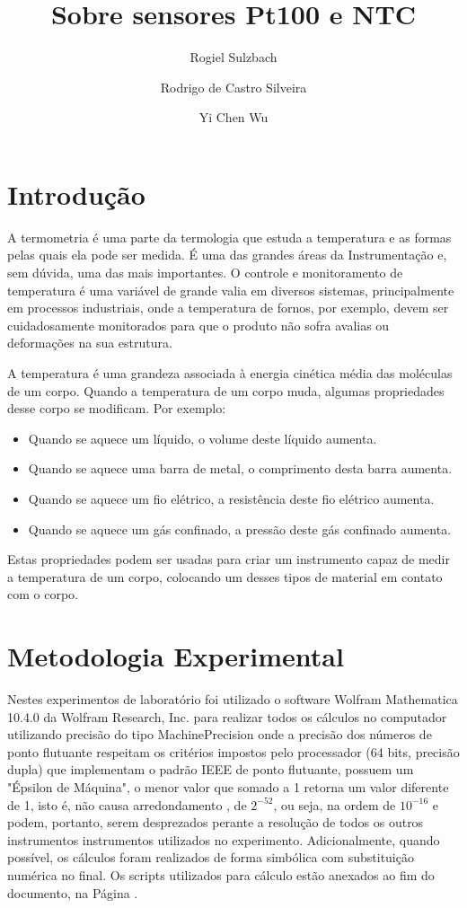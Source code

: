 \documentclass[a4paper]{instrumentacao}
\title{Sobre sensores Pt100 e NTC}
\author{Rogiel Sulzbach \and Rodrigo de Castro Silveira \and Yi Chen Wu}
\institute{Universidade Federal do Rio Grande do Sul, Departamento de Engenharia Elétrica, Curso de Engenharia Elétrica, Instrumentação A, Profs. Dr. Alexandre Balbinot e Dra. Léia Bagesteiro}
\begin{document}
\maketitle


\chapter{Introdução}
A termometria é uma parte da termologia que estuda a temperatura e as formas pelas quais ela pode ser medida.  É uma das grandes áreas da Instrumentação e, sem dúvida, uma das mais importantes. O controle e monitoramento de temperatura é uma variável de grande valia em diversos sistemas, principalmente em processos industriais, onde a temperatura de fornos, por exemplo, devem ser cuidadosamente monitorados para que o produto não sofra avalias ou deformações na sua estrutura.

A temperatura é uma grandeza associada à energia cinética média das moléculas de um corpo. Quando a temperatura de um corpo muda, algumas propriedades desse corpo se modificam. Por exemplo:

\begin{itemize}
	\item Quando se aquece um líquido, o volume deste líquido aumenta.
	\item Quando se aquece uma barra de metal, o comprimento desta barra aumenta.
	\item Quando se aquece um fio elétrico, a resistência deste fio elétrico aumenta.
	\item Quando se aquece um gás confinado, a pressão deste gás confinado aumenta.
\end{itemize}

Estas propriedades podem ser usadas para criar um instrumento capaz de medir a temperatura de um corpo, colocando um desses tipos de material em contato com o corpo.

\chapter{Metodologia Experimental}

Nestes experimentos de laboratório foi utilizado o software Wolfram Mathematica 10.4.0 da Wolfram Research, Inc. para realizar todos os cálculos no computador utilizando precisão do tipo MachinePrecision\cite{mathematica-numerial-precision} onde a precisão dos números de ponto flutuante respeitam os critérios impostos pelo processador (64 bits, precisão dupla) que implementam o padrão IEEE de ponto flutuante, possuem um "Épsilon de Máquina", o menor valor que somado a 1 retorna um valor diferente de 1, isto é, não causa arredondamento \cite{wikipedia-epsilon}, de $2^{-52}$, ou seja, na ordem de $10^{-16}$ e podem, portanto, serem desprezados perante a resolução de todos os outros instrumentos instrumentos utilizados no experimento. Adicionalmente, quando possível, os cálculos foram realizados de forma simbólica com substituição numérica no final. Os scripts utilizados para cálculo estão anexados ao fim do documento, na Página \pageref{ch:attachments}.
\end{document}
